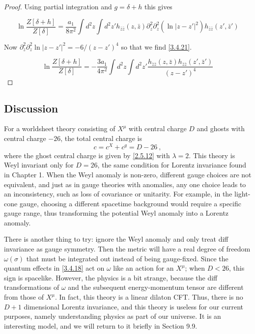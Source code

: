 \begin{tcolorbox}[breakable]
\begin{proof}
		Using partial integration and \( g = \delta + h \) this gives
		
		\begin{equation}
			\ln \frac{Z[\delta + h]}{Z[\delta]} = \frac{a_1}{8\pi^2} \int d^2 z \int d^2 z' h_{\bar z\bar{z}}(z,\bar{z}) \partial_z^2 \partial_z^2 (\ln |z - z'|^2) h_{\bar{z}\bar{z}}(z',\bar{z}')
		\end{equation}
		
		Now \( \partial_z^2 \partial_z^2 \ln |z - z'|^2 = -6/(z - z')^4 \) so that we find \eqref{3.4.21}.
		
		\begin{equation}
			\ln \frac{Z[\delta + h]}{Z[\delta]} = -\frac{3a_1}{4\pi^2} \int d^2 z \int d^2 z' \frac{h_{\bar z\bar{z}}(z,\bar{z}) h_{\bar{z}\bar{z}}(z',\bar{z}')}{(z-z')^4}
		\end{equation}
	\end{proof}
\end{tcolorbox}
\subsection*{Discussion}
For a worldsheet theory consisting of $X^\mu$ with central charge $D$ and ghosts with central charge $-26$, the total central charge is    
\begin{equation}
	c=c^{X}+c^{g}=D-26 \:, \label{3.4.23}
\end{equation}
where the ghost central charge is given by \eqref{2.5.12} with $\lambda=2$. This theory is Weyl invariant only for $D=26$, the same condition for Lorentz invariance found in Chapter 1.    
When the Weyl anomaly is non-zero, different gauge choices are not equivalent, and just as in gauge theories with anomalies, any one choice leads to an inconsistency, such as loss of covariance or unitarity. For example, in the light-cone gauge, choosing a different spacetime background would require a specific gauge range, thus transforming the potential Weyl anomaly into a Lorentz anomaly.    

There is another thing to try: ignore the Weyl anomaly and only treat diff invariance as gauge symmetry. Then the metric will have a real degree of freedom $\omega(\sigma)$ that must be integrated out instead of being gauge-fixed. Since the quantum effects in \eqref{3.4.18} act on $\omega$ like an action for an $X^\mu$; when $D<26$, this sign is spacelike. However, the physics is a bit strange, because the diff transformations of $\omega$ and the subsequent energy-momentum tensor are different from those of $X^\mu$.    
In fact, this theory is a linear dilaton CFT. Thus, there is no $D+1$ dimensional Lorentz invariance, and this theory is useless for our current purposes, namely understanding physics as part of our universe. It is an interesting model, and we will return to it briefly in Section 9.9.    


